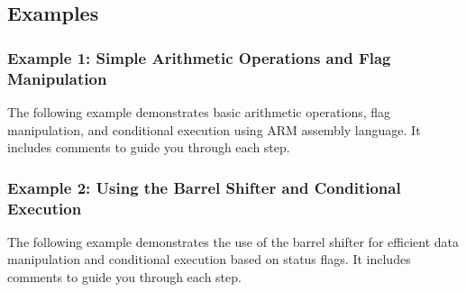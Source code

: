 \subsection{Examples}
\subsubsection{Example 1: Simple Arithmetic Operations and Flag Manipulation}
The following example demonstrates basic arithmetic operations, flag manipulation, and conditional execution using ARM assembly language. It includes comments to guide you through each step.

\newpage
\subsubsection{Example 2: Using the Barrel Shifter and Conditional Execution}
The following example demonstrates the use of the barrel shifter for efficient data manipulation and conditional execution based on status flags. It includes comments to guide you through each step.


